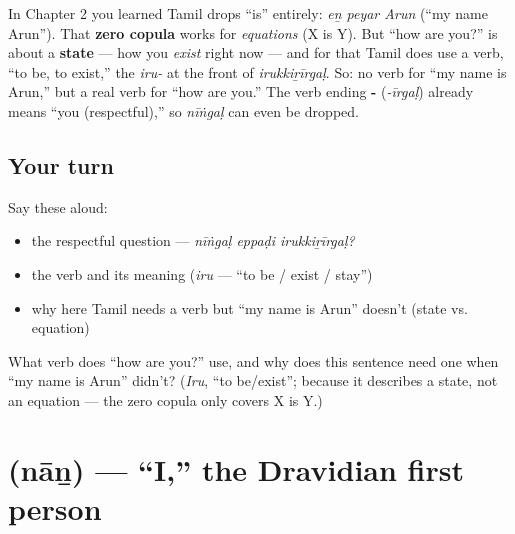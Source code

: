 \begin{grammarlens}[title={Grammar Lens: now the copula returns}]
In Chapter 2 you learned Tamil drops \textquotedblleft{}is\textquotedblright{} entirely: \emph{eṉ peyar Arun} (\textquotedblleft{}my name Arun\textquotedblright{}). That \textbf{zero copula} works for \emph{equations} (X is Y). But \textquotedblleft{}how are you?\textquotedblright{} is about a \textbf{state} — how you \emph{exist} right now — and for that Tamil does use a verb, \textquotedblleft{}to be, to exist,\textquotedblright{} the \emph{iru-} at the front of \emph{irukkiṟīrgaḷ}. So: no verb for \textquotedblleft{}my name is Arun,\textquotedblright{} but a real verb for \textquotedblleft{}how are you.\textquotedblright{} The verb ending \textbf{-} (\emph{-īrgaḷ}) already means \textquotedblleft{}you (respectful),\textquotedblright{} so \emph{nīṅgaḷ} can even be dropped.
\end{grammarlens}

\subsection*{Your turn}
Say these aloud:

\begin{itemize}
\raggedright
  \item the respectful question — \emph{nīṅgaḷ eppaḍi irukkiṟīrgaḷ?}
  \item the verb and its meaning (\emph{iru} — \textquotedblleft{}to be / exist / stay\textquotedblright{})
  \item why here Tamil needs a verb but \textquotedblleft{}my name is Arun\textquotedblright{} doesn't (state vs. equation)
\end{itemize}

\begin{tcolorbox}[breakable,colback=teal!4,colframe=teal!35!black,title={Before you move on}]
What verb does \textquotedblleft{}how are you?\textquotedblright{} use, and why does this sentence need one when \textquotedblleft{}my name is Arun\textquotedblright{} didn't? (\emph{Iru}, \textquotedblleft{}to be/exist\textquotedblright{}; because it describes a state, not an equation — the zero copula only covers X is Y.)
\end{tcolorbox}
\section[\texorpdfstring{\ta{நான்} (nāṉ)}{நான் (nāṉ)}]{ (nāṉ) — \textquotedblleft{}I,\textquotedblright{} the Dravidian first person}

